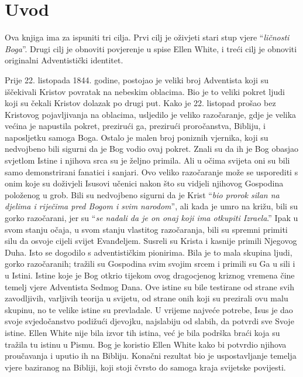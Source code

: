 \chapter*{Uvod}

Ova knjiga ima za ispuniti tri cilja. Prvi cilj je oživjeti stari stup vjere “\textit{ličnosti Boga}”. Drugi cilj je obnoviti povjerenje u spise Ellen White, i treći cilj je obnoviti originalni Adventistički identitet.

Prije 22. listopada 1844. godine, postojao je veliki broj Adventista koji su iščekivali Kristov povratak na nebeskim oblacima. Bio je to veliki pokret ljudi koji su čekali Kristov dolazak po drugi put. Kako je 22. listopad prošao bez Kristovog pojavljivanja na oblacima, usljedilo je veliko razočaranje, gdje je velika većina je napustila pokret, prezirući ga, prezirući proročanstva, Bibliju, i naposljetku samoga Boga. Ostalo je malen broj poniznih vjernika, koji su nedvojbeno bili sigurni da je Bog vodio ovaj pokret. Znali su da ih je Bog obasjao svjetlom Istine i njihova srca su je željno primila. Ali u očima svijeta oni su bili samo demonstrirani fanatici i sanjari. Ovo veliko razočaranje može se usporediti s onim koje su doživjeli Isusovi učenici nakon što su vidjeli njihovog Gospodina položenog u grob. Bili su nedvojbeno sigurni da je Krist “\textit{bio prorok silan na djelima i riječima pred Bogom i svim narodom}”, ali kada je umro na križu, bili su gorko razočarani, jer su “\textit{se nadali da je on onaj koji ima otkupiti Izraela}.” Ipak u svom stanju očaja, u svom stanju vlastitog razočaranja, bili su spremni primiti silu da osvoje cijeli svijet Evanđeljem. Susreli su Krista i kasnije primili Njegovog Duha. Isto se dogodilo s adventističkim pionirima. Bila je to mala skupina ljudi, gorko razočaranih; tražili su Gospodina svim svojim srcem i primili su Ga u sili i u Istini. Istine koje je Bog otkrio tijekom ovog dragocjenog kriznog vremena čine temelj vjere Adventista Sedmog Dana. Ove istine su bile testirane od strane svih zavodljivih, varljivih teorija u svijetu, od strane onih koji su prezirali ovu malu skupinu, no te velike istine su prevladale. U vrijeme najveće potrebe, Isus je dao svoje svjedočanstvo podižući djevojku, najslabiju od slabih, da potvrdi sve Svoje istine. Ellen White nije bila izvor tih istina, već je bila podrška braći koja su tražila tu istinu u Pismu. Bog je koristio Ellen White kako bi potvrdio njihova proučavanja i uputio ih na Bibliju. Konačni rezultat bio je uspostavljanje temelja vjere baziranog na Bibliji, koji stoji čvrsto do samoga kraja svijetske povijesti.

